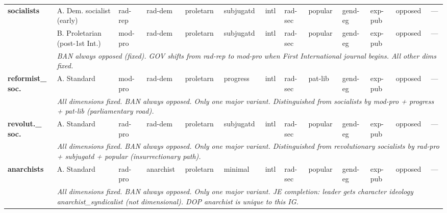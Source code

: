 \documentclass[a4paper]{article}
\newcommand{\nd}{---}
\newcommand{\minorrow}[2]{\rowcolor{minorRow} #1 & \multicolumn{12}{p{22cm}|}{\textit{#2}} \\}
\begin{document}
\begin{footnotesize}
\begin{longtable}{|p{1.8cm}|p{2.3cm}|p{1.55cm}|p{1.65cm}|p{1.65cm}|p{1.3cm}|p{1.5cm}|p{1.5cm}|p{1.5cm}|p{1.3cm}|p{1.45cm}|p{1.0cm}|p{2.65cm}|}
\multirow{3}{*}{\cellcolor{leftHdr}\textbf{socialists}} &
  A. Dem. socialist (early) & rad-rep & rad-dem & proletarn & subjugatd & intl & rad-sec & popular & gend-eg & exp-pub & opposed & \nd \\ \cline{2-13}
\cellcolor{leftHdr} &
  B. Proletarian (post-1st Int.) & mod-pro & rad-dem & proletarn & subjugatd & intl & rad-sec & popular & gend-eg & exp-pub & opposed & \nd \\ \cline{2-13}
\minorrow{\cellcolor{leftHdr}}{BAN always opposed (fixed). GOV shifts from rad-rep to mod-pro when First International journal begins. All other dims fixed.}
\hline

\multirow{2}{*}{\cellcolor{leftHdr}\textbf{reformist\_ soc.}} &
  A. Standard & mod-pro & rad-dem & proletarn & progress & intl & rad-sec & pat-lib & gend-eg & exp-pub & opposed & \nd \\ \cline{2-13}
\minorrow{\cellcolor{leftHdr}}{All dimensions fixed. BAN always opposed. Only one major variant. Distinguished from socialists by mod-pro + progress + pat-lib (parliamentary road).}
\hline

\multirow{2}{*}{\cellcolor{leftHdr}\textbf{revolut.\_ soc.}} &
  A. Standard & rad-pro & rad-dem & proletarn & subjugatd & intl & rad-sec & popular & gend-eg & exp-pub & opposed & \nd \\ \cline{2-13}
\minorrow{\cellcolor{leftHdr}}{All dimensions fixed. BAN always opposed. Only one major variant. Distinguished from revolutionary socialists by rad-pro + subjugatd + popular (insurrectionary path).}
\hline

\multirow{2}{*}{\cellcolor{leftHdr}\textbf{anarchists}} &
  A. Standard & rad-pro & anarchist & proletarn & minimal & intl & rad-sec & popular & gend-eg & exp-pub & opposed & \nd \\ \cline{2-13}
\minorrow{\cellcolor{leftHdr}}{All dimensions fixed. BAN always opposed. Only one major variant. JE completion: leader gets character ideology anarchist\_syndicalist (not dimensional). DOP anarchist is unique to this IG.}
\hline

\end{longtable}
\end{footnotesize}
\end{document}
